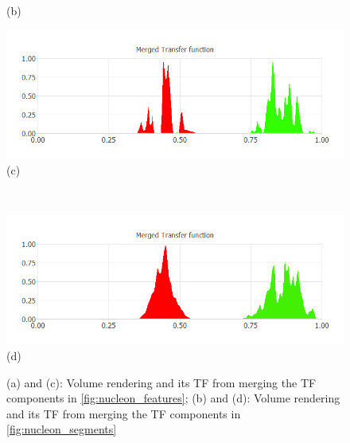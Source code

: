 \documentclass[twoside,twocolumn,10pt]{article}
\begin{document}
\begin{figure}
\begin{minipage}{.16\textwidth}
		(b)
	\end{minipage}
	\begin{minipage}{.16\textwidth}
		\centering
		\includegraphics[width=1\linewidth]{nucleon_green_red_Merged_Transfer_function}
		(c)
	\end{minipage}~
	\begin{minipage}{.16\textwidth}
		\centering
		\includegraphics[width=1\linewidth]{nucleon_green_red_segment_Merged_Transfer_function}
		(d)
	\end{minipage}
	\caption{(a) and (c): Volume rendering and its TF from merging the TF components in \autoref{fig:nucleon_features}; (b) and (d): Volume rendering and its TF from merging the TF components in \autoref{fig:nucleon_segments}}
	\label{fig:nucleon_merged}
\end{figure}

\end{document}
